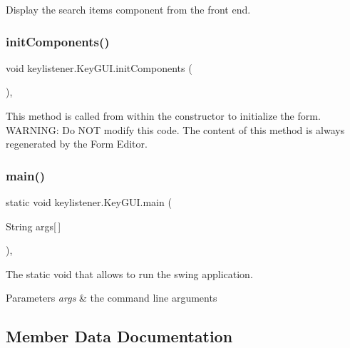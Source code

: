 Display the search item\textquotesingle{}s component from the front end. \mbox{\label{classkeylistener_1_1_key_g_u_i_a43be7b88fdba1420ee3f0d1c2c4c2748}} 
\subsubsection{\texorpdfstring{init\+Components()}{initComponents()}}
{\footnotesize\ttfamily void keylistener.\+Key\+G\+U\+I.\+init\+Components (\begin{DoxyParamCaption}{ }\end{DoxyParamCaption})\hspace{0.3cm}{\ttfamily [inline]}, {\ttfamily [private]}}

This method is called from within the constructor to initialize the form. W\+A\+R\+N\+I\+NG\+: Do N\+OT modify this code. The content of this method is always regenerated by the Form Editor. \mbox{\label{classkeylistener_1_1_key_g_u_i_ac0043858e116673e920af7f1542f5376}} 
\subsubsection{\texorpdfstring{main()}{main()}}
{\footnotesize\ttfamily static void keylistener.\+Key\+G\+U\+I.\+main (\begin{DoxyParamCaption}\item[{String}]{args\mbox{[}$\,$\mbox{]} }\end{DoxyParamCaption})\hspace{0.3cm}{\ttfamily [inline]}, {\ttfamily [static]}}

The static void that allows to run the swing application. 
\begin{DoxyParams}{Parameters}
{\em args} & the command line arguments \\
\hline
\end{DoxyParams}


\subsection{Member Data Documentation}
\mbox{\label{classkeylistener_1_1_key_g_u_i_ad2118979cc01e139f390529e68561b36}} 
